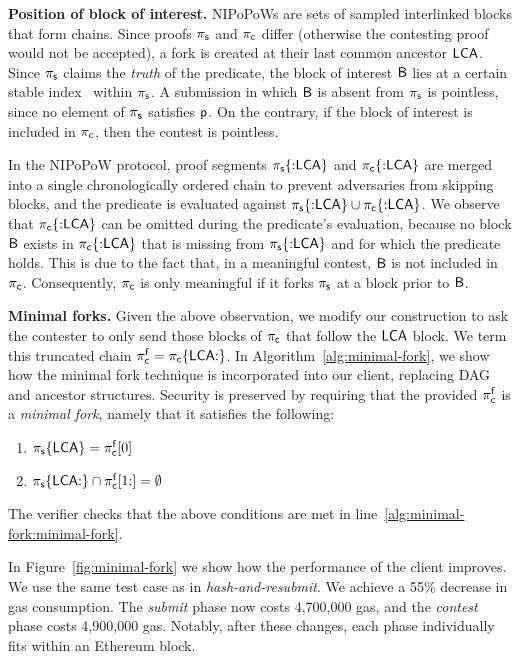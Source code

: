 \noindent \textbf{Position of block of interest.} NIPoPoWs are sets of sampled
interlinked blocks that form chains. Since proofs
$\mathsf{\pi_{s}}$ and $\mathsf{\pi_{c}}$ differ (otherwise the contesting proof would not be accepted),
a fork is created at
their last common ancestor $\mathsf{LCA}$. Since $\mathsf{\pi_{s}}$ claims the \emph{truth} of the
predicate, the block of interest $\mathsf{B}$ lies at a certain
stable index~\cite{nipopows,generic-client} within $\mathsf{\pi_{s}}$. A submission in which $\mathsf{B}$ is
absent from $\mathsf{\pi_{s}}$ is pointless, since no element
of $\mathsf{\pi_{s}}$ satisfies $\mathsf{p}$. On the contrary, if the block of
interest is included in $\mathsf{\pi_{c}}$, then the contest is pointless.

\newcommand{\block}{\mathsf{B}}

In the NIPoPoW protocol, proof segments $\mathsf{\pi_{s}}\{{{:}}\mathsf{LCA}\}$ and
$\mathsf{\pi_{c}}\{{:}\mathsf{LCA}\}$ are merged into a single chronologically ordered chain to prevent adversaries from skipping
blocks, and the predicate is evaluated against $\mathsf{\pi_{s}}\{{:}\mathsf{LCA}\} \cup
\mathsf{\pi_{c}}\{{:}\mathsf{LCA}\}$. We observe that $\mathsf{\pi_{c}}\{{:}\mathsf{LCA}\}$ can be omitted during the predicate's evaluation, because no
block $\mathsf{B}$ exists in $\mathsf{\pi_{c}}\{{:}\mathsf{LCA}\}$ that is missing from $\mathsf{\pi_{s}}\{{:}\mathsf{LCA}\}$
and for which the predicate holds. This is due to the fact that, in a meaningful contest, $\mathsf{B}$
is not included in $\mathsf{\pi_{c}}$. Consequently, $\mathsf{\pi_{c}}$ is only meaningful if it forks
$\mathsf{\pi_{s}}$ at a block prior to $\mathsf{B}$.

\noindent \textbf{Minimal forks.} Given the above observation, we modify our construction
to ask the contester to only send those blocks of $\mathsf{\pi_{c}}$ that follow the $\mathsf{LCA}$ block.
We term this truncated chain $\mathsf{\pi_{c}^{f}} = \mathsf{\pi_{c}}\{\mathsf{LCA}{:}\}$.
In Algorithm~\ref{alg:minimal-fork}, we show how the minimal fork technique is
incorporated into our client, replacing DAG and ancestor structures.
Security is preserved by requiring that the provided $\mathsf{\pi_{c}^{f}}$ is a \emph{minimal fork}, namely
that it satisfies the following:

\begin{enumerate}
\item $\mathsf{\pi_{s}}\{\mathsf{LCA}\} = \mathsf{\pi_{c}^{f}}[0]$
\item $\mathsf{\pi_{s}}\{\mathsf{LCA}{:}\} \cap \mathsf{\pi_{c}^{f}}[1{:}] = \emptyset$
\end{enumerate}

The verifier checks that the above conditions are met in line~\ref{alg:minimal-fork:minimal-fork}.

In
Figure~\ref{fig:minimal-fork} we show how the performance of the client
improves. We use the same test case as in \emph{hash-and-resubmit}.
We achieve a 55\% decrease in gas
consumption. The \emph{submit} phase now costs {4{,}700{,}000} gas, and
the \emph{contest} phase costs {4{,}900{,}000} gas. Notably, after these
changes, each phase individually fits within an Ethereum block.

